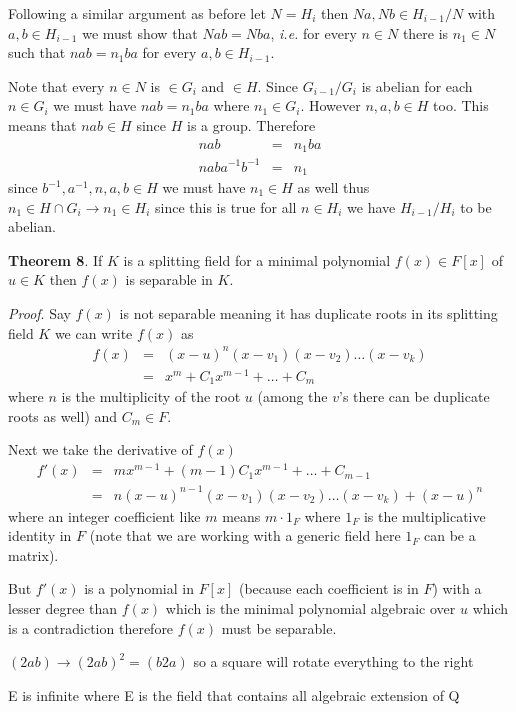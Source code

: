 \documentclass[aps,preprint,preprintnumbers,nofootinbib,showpacs,prd]{revtex4-1}
\newcommand{\ie}{{\it i.e.} }
\newcommand{\nbea}{\begin{eqnarray*}}
\newcommand{\neea}{\end{eqnarray*}}
\begin{document}
Following a similar argument as before let $N = H_i$ then $Na,Nb \in H_{i-1}/N$ with $a,b \in H_{i-1}$ we must show that  $Nab = Nba$, \ie for every $n \in N$ there is $n_1 \in N$ such that $nab = n_1ba$ for every $a,b \in H_{i-1}$.

Note that every $n \in N$ is $\in G_i$ and $\in H$. Since $G_{i-1}/G_i$ is abelian for each $n \in G_i$ we must have $nab = n_1ba$ where $n_1 \in G_i$. However $n,a,b \in H$ too. This means that $nab \in H$ since $H$ is a group. Therefore
%
\nbea
nab & = & n_1ba \\
n aba^{-1}b^{-1} & = & n_1
\neea
%
since $b^{-1}, a^{-1}, n, a, b \in H$ we must have $n_1 \in H$ as well thus $n_1 \in H \cap G_i \to n_1 \in H_i$ since this is true for all $n \in H_i$ we have $H_{i-1}/H_i$ to be abelian.

{\bf Theorem 8}. If $K$ is a splitting field for a minimal polynomial $f(x) \in F[x]$ of $u \in K$ then $f(x)$ is separable in $K$.

{\it Proof}. Say $f(x)$ is not separable meaning it has duplicate roots in its splitting field $K$ we can write $f(x)$ as 
%
\nbea
f(x) & = & (x - u)^n(x - v_1)(x - v_2) \dots (x - v_k) \\
& = & x^m + C_1 x^{m-1} + \dots + C_m
\neea
%
where $n$ is the multiplicity of the root $u$ (among the $v$'s there can be duplicate roots as well) and $C_m \in F$. 

Next we take the derivative of $f(x)$
%
\nbea
f'(x) & = & m x^{m-1} + (m-1)C_1 x^{m-1} + \dots + C_{m-1} \\
& = & n(x - u)^{n-1}(x - v_1)(x - v_2) \dots (x - v_k) + (x - u)^n
\neea
%
where an integer coefficient like $m$ means $m \cdot 1_F$ where $1_F$ is the multiplicative identity in $F$ (note that we are working with a generic field here $1_F$ can be a matrix).

But $f'(x)$ is a polynomial in $F[x]$ (because each coefficient is in $F$) with a lesser degree than $f(x)$ which is the minimal polynomial algebraic over $u$ which is a contradiction therefore $f(x)$ must be separable.






















$(2ab) \to (2ab)^2 = (b2a)$ so a square will rotate everything to the right

E is infinite where E is the field that contains all algebraic extension of Q
\end{document}
